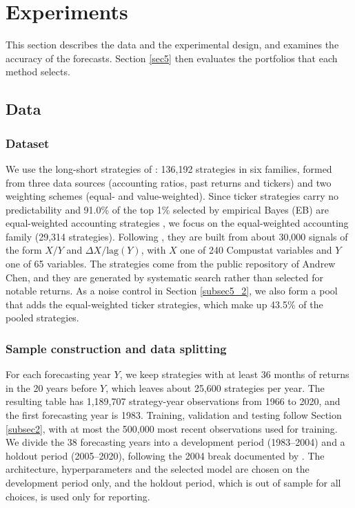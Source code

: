 \documentclass[pdflatex,sn-mathphys-num]{sn-jnl}%
\theoremstyle{thmstyleone}%
\theoremstyle{thmstyletwo}%
\theoremstyle{thmstylethree}%
\begin{document}
\section{Experiments}\label{sec4}

This section describes the data and the experimental design, and examines the accuracy of the forecasts. Section \ref{sec5} then evaluates the portfolios that each method selects.

\subsection{Data}\label{subsec4_1}

\subsubsection{Dataset}
We use the long-short strategies of \cite{chen2025highthroughputassetpricing}: 136,192 strategies in six families, formed from three data sources (accounting ratios, past returns and tickers) and two weighting schemes (equal- and value-weighted). Since ticker strategies carry no predictability and 91.0\% of the top 1\% selected by empirical Bayes (EB) are equal-weighted accounting strategies \cite{chen2025highthroughputassetpricing}, we focus on the equal-weighted accounting family (29,314 strategies). Following \citet{yan2017fundamental}, they are built from about 30,000 signals of the form $X/Y$ and $\Delta X/\mathrm{lag}(Y)$, with $X$ one of 240 Compustat variables and $Y$ one of 65 variables. The strategies come from the public repository of Andrew Chen, and they are generated by systematic search rather than selected for notable returns. As a noise control in Section \ref{subsec5_2}, we also form a pool that adds the equal-weighted ticker strategies, which make up 43.5\% of the pooled strategies.

\subsubsection{Sample construction and data splitting}
For each forecasting year $Y$, we keep strategies with at least 36 months of returns in the 20 years before $Y$, which leaves about 25,600 strategies per year. The resulting table has 1,189,707 strategy-year observations from 1966 to 2020, and the first forecasting year is 1983. Training, validation and testing follow Section \ref{subsec2}, with at most the 500,000 most recent observations used for training. We divide the 38 forecasting years into a development period (1983--2004) and a holdout period (2005--2020), following the 2004 break documented by \cite{chen2025highthroughputassetpricing}. The architecture, hyperparameters and the selected model are chosen on the development period only, and the holdout period, which is out of sample for all choices, is used only for reporting.
\end{document}
